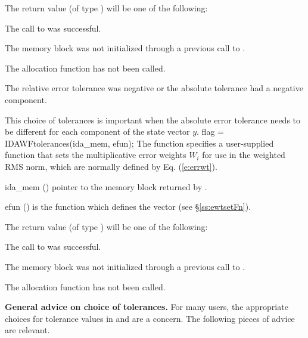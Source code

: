 {
  The return value  (of type ) will be one of the following:
  \begin{args}
  \item[\Id{IDA\_SUCCESS}]
    The call to  was successful.
  \item[\Id{IDA\_MEM\_NULL}] 
    The {\ida} memory block was not initialized through a previous call to
    .
  \item[\Id{IDA\_NO\_MALLOC}] 
    The allocation function  has not been called.
  \item[\Id{IDA\_ILL\_INPUT}] 
    The relative error tolerance was negative or the absolute tolerance
    had a negative component.
  \end{args}
}
{
  This choice of tolerances is important when the absolute error tolerance needs to
  be different for each component of the state vector $y$. 
}
{
  flag = IDAWFtolerances(ida\_mem, efun);
}
{
  The function  specifies a user-supplied function 
  that sets the multiplicative error weights $W_i$ for use in the weighted
  RMS norm, which are normally defined by Eq. (\ref{e:errwt}).
}
{
  \begin{args}
  \item[ida\_mem] ()
    pointer to the {\ida} memory block returned by .
  \item[efun] () 
    is the {\C} function which defines the  vector (see
    \S\ref{ss:ewtsetFn}).
  \end{args}
}
{
  The return value  (of type ) will be one of the following:
  \begin{args}
  \item[\Id{IDA\_SUCCESS}]
    The call to  was successful.
  \item[\Id{IDA\_MEM\_NULL}] 
    The {\ida} memory block was not initialized through a previous call to
    .
  \item[\Id{IDA\_NO\_MALLOC}] 
    The allocation function  has not been called.
  \end{args}
}
{}

{\bf General advice on choice of tolerances.}
For many users, the appropriate choices for tolerance values in
 and  are a concern.  The following pieces of
advice are relevant.

